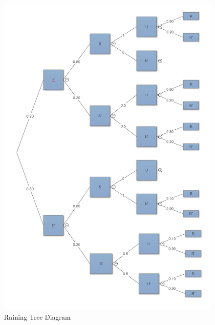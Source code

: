 \documentclass{article}
\begin{document}
\begin{figure}[H]
    \centering
    \includegraphics[scale=0.7]{"P6C"}
    \caption{ Raining Tree Diagram }
\end{figure}
\end{document}

